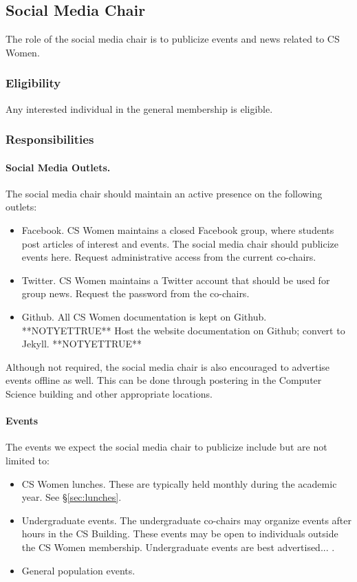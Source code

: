\subsection{Social Media Chair}
\label{sec:socialmedia}
The role of the social media chair is to publicize events and news related to CS Women. 

\subsubsection{Eligibility}
\label{sec:socialmedia_eligibility}
Any interested individual in the general membership is eligible. 

\subsubsection{Responsibilities}
\label{sec:socialmedia_responsibilities}
\paragraph{Social Media Outlets.} The social media chair should maintain an active presence on the following outlets:
\begin{itemize}
	\item Facebook. CS Women maintains a closed Facebook group, where students post articles of interest and events. The social media chair should publicize events here. Request administrative access from the current co-chairs.
	\item Twitter. CS Women maintains a Twitter account that should be used for group news. Request the password from the co-chairs.
	\item Github. All CS Women documentation is kept on Github. **NOTYETTRUE** Host the website documentation on Github; convert to Jekyll. **\/NOTYETTRUE** 
\end{itemize}
Although not required, the social media chair is also encouraged to advertise events offline as well. This can be done through postering in the Computer Science building and other appropriate locations.

\label{sec:socialmedia_eligibility}
\paragraph{Events} The events we expect the social media chair to publicize include but are not limited to:
\begin{itemize}
	\item CS Women lunches. These are typically held monthly during the academic year. See \S\ref{sec:lunches}.
	\item Undergraduate events. The undergraduate co-chairs may organize events after hours in the CS Building. These events may be open to individuals outside the CS Women membership. Undergraduate events are best advertised... .
	\item General population events. 
\end{itemize}

